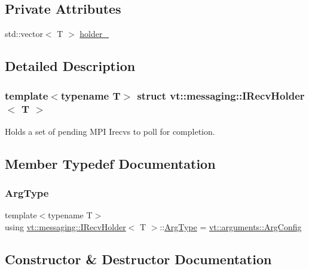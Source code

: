\subsection*{Private Attributes}
\begin{DoxyCompactItemize}
\item 
std\+::vector$<$ T $>$ \hyperlink{structvt_1_1messaging_1_1_i_recv_holder_ad906203e102f9180b56d66393bd47c55}{holder\+\_\+}
\end{DoxyCompactItemize}


\subsection{Detailed Description}
\subsubsection*{template$<$typename T$>$\newline
struct vt\+::messaging\+::\+I\+Recv\+Holder$<$ T $>$}

Holds a set of pending M\+PI Irecvs to poll for completion. 

\subsection{Member Typedef Documentation}
\mbox{\label{structvt_1_1messaging_1_1_i_recv_holder_aae9327cb1e82d6aee682457739dad4b5}} 
\subsubsection{\texorpdfstring{Arg\+Type}{ArgType}}
{\footnotesize\ttfamily template$<$typename T$>$ \\
using \hyperlink{structvt_1_1messaging_1_1_i_recv_holder}{vt\+::messaging\+::\+I\+Recv\+Holder}$<$ T $>$\+::\hyperlink{structvt_1_1messaging_1_1_i_recv_holder_aae9327cb1e82d6aee682457739dad4b5}{Arg\+Type} =  \hyperlink{structvt_1_1arguments_1_1_arg_config}{vt\+::arguments\+::\+Arg\+Config}}



\subsection{Constructor \& Destructor Documentation}
\mbox{\label{structvt_1_1messaging_1_1_i_recv_holder_a709a349d723247b10bf57ca2831bfe19}} 
